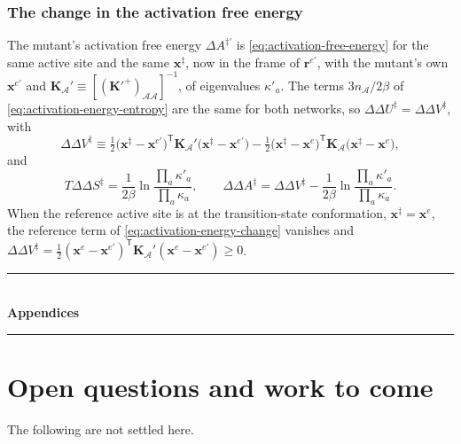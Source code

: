\documentclass[11pt]{article}
\newcommand{\rr}{\mathbf{r}}
\newcommand{\KK}{\mathbf{K}}
\newcommand{\rem}{\rr^{e\prime}}   %
\newcommand{\xx}{\mathbf{x}}
\newcommand{\cA}{\mathcal{A}}
\newcommand{\nA}{n_{\cA}}
\newcommand{\KA}{\KK_{\cA}}
\newcommand{\xts}{\xx^{\ddagger}}
\begin{document}
\subsubsection{The change in the activation free energy}

The mutant's activation free energy $\Delta A^{\ddagger\prime}$ is \eqref{eq:activation-free-energy} for the same active site and the same $\xts$, now in the frame of $\rem$, with the mutant's own $\xx^{e\prime}$ and $\KA' \equiv [(\KK'^{+})_{\cA\cA}]^{-1}$, of eigenvalues $\kappa'_a$.
The terms $3\nA/2\beta$ of \eqref{eq:activation-energy-entropy} are the same for both networks, so $\Delta\Delta U^{\ddagger} = \Delta\Delta V^{\ddagger}$, with
\begin{equation}
\Delta\Delta V^{\ddagger} \equiv
\tfrac12 \big(\xts - \xx^{e\prime}\big)^{\mathsf T}\KA'\big(\xts - \xx^{e\prime}\big)
- \tfrac12 \big(\xts - \xx^{e}\big)^{\mathsf T}\KA\big(\xts - \xx^{e}\big) ,
\label{eq:activation-energy-change}
\end{equation}
and
\begin{equation}
\boxed{
T\Delta\Delta S^{\ddagger} = \frac{1}{2\beta} \ln
\frac{\prod_{a} \kappa'_a}{\prod_{a} \kappa_a} ,
\qquad
\Delta\Delta A^{\ddagger} = \Delta\Delta V^{\ddagger} - \frac{1}{2\beta} \ln
\frac{\prod_{a} \kappa'_a}{\prod_{a} \kappa_a} .
}
\label{eq:activation-free-energy-change}
\end{equation}
When the reference active site is at the transition-state conformation, $\xts = \xx^{e}$, the reference term of \eqref{eq:activation-energy-change} vanishes and $\Delta\Delta V^{\ddagger} = \tfrac12 (\xx^{e} - \xx^{e\prime})^{\mathsf T}\KA'(\xx^{e} - \xx^{e\prime}) \ge 0$.

\clearpage
\appendix
\begin{center}
\rule{\textwidth}{0.4pt}\\[2pt]
{\Large\bfseries Appendices}\\[-6pt]
\rule{\textwidth}{0.4pt}
\end{center}
\bigskip


\section{Open questions and work to come}
\label{sec:open}

The following are not settled here.
\end{document}
